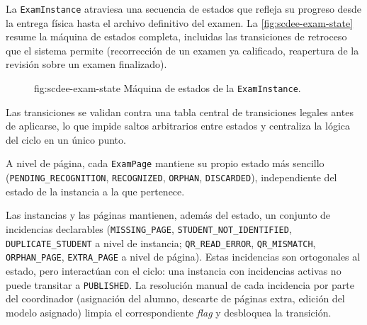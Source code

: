 La \texttt{ExamInstance} atraviesa una secuencia de estados que refleja
su progreso desde la entrega física hasta el archivo definitivo del
examen. La \cref{fig:scdee-exam-state} resume la máquina de estados
completa, incluidas las transiciones de retroceso que el sistema permite
(recorrección de un examen ya calificado, reapertura de la revisión sobre
un examen finalizado).

\begin{figure}[Máquina de estados de la \texttt{ExamInstance}]%
              {fig:scdee-exam-state}%
              {Máquina de estados de la \texttt{ExamInstance}.}
\end{figure}

Las transiciones se validan contra una tabla central de transiciones
legales antes de aplicarse, lo que impide saltos arbitrarios entre
estados y centraliza la lógica del ciclo en un único punto.

A nivel de página, cada \texttt{ExamPage} mantiene su propio estado más
sencillo (\texttt{PENDING\_RECOGNITION}, \texttt{RECOGNIZED},
\texttt{ORPHAN}, \texttt{DISCARDED}), independiente del estado de la
instancia a la que pertenece.

Las instancias y las páginas mantienen, además del estado, un conjunto
de incidencias declarables (\texttt{MISSING\_PAGE},
\texttt{STUDENT\_NOT\_IDENTIFIED}, \texttt{DUPLICATE\_STUDENT} a nivel
de instancia; \texttt{QR\_READ\_ERROR}, \texttt{QR\_MISMATCH},
\texttt{ORPHAN\_PAGE}, \texttt{EXTRA\_PAGE} a nivel de página). Estas
incidencias son ortogonales al estado, pero interactúan con el ciclo:
una instancia con incidencias activas no puede transitar a
\texttt{PUBLISHED}. La resolución manual de cada incidencia por parte
del coordinador (asignación del alumno, descarte de páginas extra,
edición del modelo asignado) limpia el correspondiente \textit{flag}
y desbloquea la transición.

